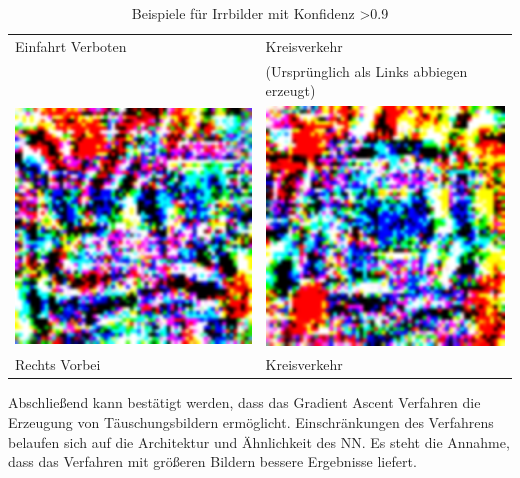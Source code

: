 \begin{table}
\begin{tabular}{p{4.4cm}p{4.4cm}}
	Einfahrt Verboten & Kreisverkehr \\
	& (Ursprünglich als Links abbiegen erzeugt)\\
	\includegraphics[width=\linewidth]{Images/AnPe/39_RechtsVorbeiOrigLinksvorbei} &\includegraphics[width=\linewidth]{Images/AnPe/40_kreisverkehr}  \\
	Rechts Vorbei& Kreisverkehr\\
\end{tabular}

\caption{Beispiele für Irrbilder mit Konfidenz >0.9}
\label{tab:gasc1}
\end{table}

Abschließend kann bestätigt werden, dass das Gradient Ascent Verfahren die Erzeugung von Täuschungsbildern ermöglicht. Einschränkungen des Verfahrens belaufen sich auf die Architektur und Ähnlichkeit des NN. Es steht die Annahme, dass das Verfahren mit größeren Bildern bessere Ergebnisse liefert.